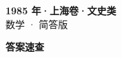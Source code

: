 \documentclass[zihao=-4, a4paper]{ctexart}
\begin{document}
\begin{center}
  {\Large\bfseries 1985 年·上海卷·文史类}\\[4pt]
  {\large 数学 · 简答版}
\end{center}
\medskip
{}

\clearpage
{}
\begin{center}{\Large\bfseries 答案速查}\end{center}
\medskip

\end{document}

